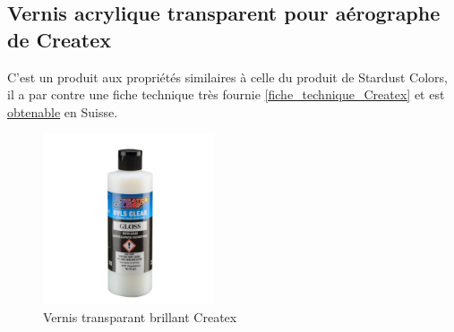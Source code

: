 \subsection{Vernis acrylique transparent pour aérographe de Createx}
C'est un produit aux propriétés similaires à celle du produit de Stardust Colors, il a par contre une fiche technique très fournie \autoref{fiche_technique_Createx} et est \href{https://www.airbrush-shop.ch/contents/de-ch/p6000.html}{obtenable} en Suisse.
\begin{figure}[H]
    \centering
    \includegraphics[width=0.45\textwidth]{assets/figures/etat_art/Createx_bouteille.jpg}
    \caption[Vernis transparant brillant Createx]{Vernis transparant brillant Createx\cite{Bouteille_Createx}}
\end{figure}
\begin{table}[H]
    \centering
    \caption{Résumé des avantages et inconvénients du vernis Createx}
    \label{tab:Createx_vernis}
\end{table}
